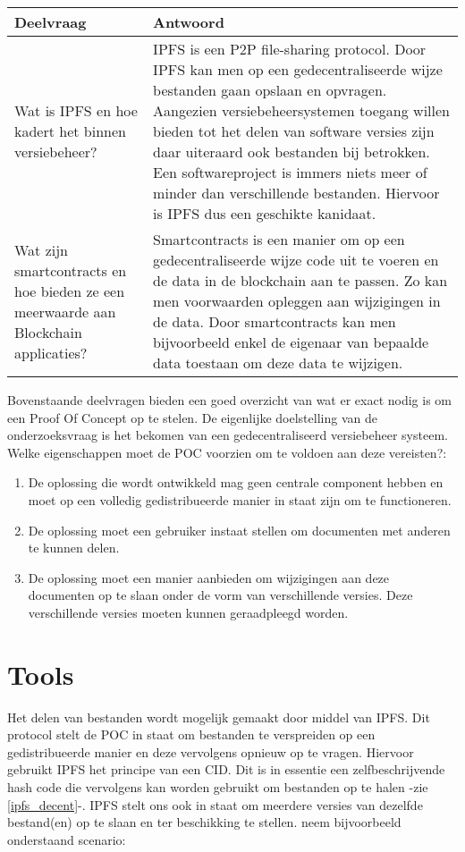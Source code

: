 \begin{table}[h!]
\begin{tabularx}{\linewidth}{ |X|X| }
\hline
Deelvraag & Antwoord \\ \hline
Wat is IPFS en hoe kadert het binnen versiebeheer? & IPFS is een P2P file-sharing protocol. Door IPFS kan men op een gedecentraliseerde wijze bestanden gaan opslaan en opvragen. Aangezien versiebeheersystemen toegang willen bieden tot het delen van software versies zijn daar uiteraard ook bestanden bij betrokken. Een softwareproject is immers niets meer of minder dan verschillende bestanden. Hiervoor is IPFS dus een geschikte kanidaat.\\ \hline
Wat zijn smartcontracts en hoe bieden ze een meerwaarde aan Blockchain applicaties? & Smartcontracts is een manier om op een gedecentraliseerde wijze code uit te voeren en de data in de blockchain aan te passen. Zo kan men voorwaarden opleggen aan wijzigingen in de data. Door smartcontracts kan men bijvoorbeeld enkel de eigenaar van bepaalde data toestaan om deze data te wijzigen.\\ \hline
\end{tabularx}
\end{table} 
\newpage
\newpage
Bovenstaande deelvragen bieden een goed overzicht van wat er exact nodig is om een Proof Of Concept op te stelen. De eigenlijke doelstelling van de onderzoeksvraag is het bekomen van een gedecentraliseerd versiebeheer systeem. Welke eigenschappen moet de POC voorzien om te voldoen aan deze vereisten?:

\begin{enumerate}
	\item De oplossing die wordt ontwikkeld mag geen centrale component hebben en moet op een volledig gedistribueerde manier in staat zijn om te functioneren.
	\item De oplossing moet een gebruiker instaat stellen om documenten met anderen te kunnen delen.
	\item De oplossing moet een manier aanbieden om wijzigingen aan deze documenten op te slaan onder de vorm van verschillende versies. Deze verschillende versies moeten kunnen geraadpleegd worden.
\end{enumerate}

\section{Tools}
Het delen van bestanden wordt mogelijk gemaakt door middel van IPFS. Dit protocol stelt de POC in staat om bestanden te verspreiden op een gedistribueerde manier en deze vervolgens opnieuw op te vragen. Hiervoor gebruikt IPFS het principe van een CID. Dit is in essentie een zelfbeschrijvende hash code die vervolgens kan worden gebruikt om bestanden op te halen -zie \ref{ipfs_decent}-. IPFS stelt ons ook in staat om meerdere versies van dezelfde bestand(en) op te slaan en ter beschikking te stellen. neem bijvoorbeeld onderstaand scenario:\\

